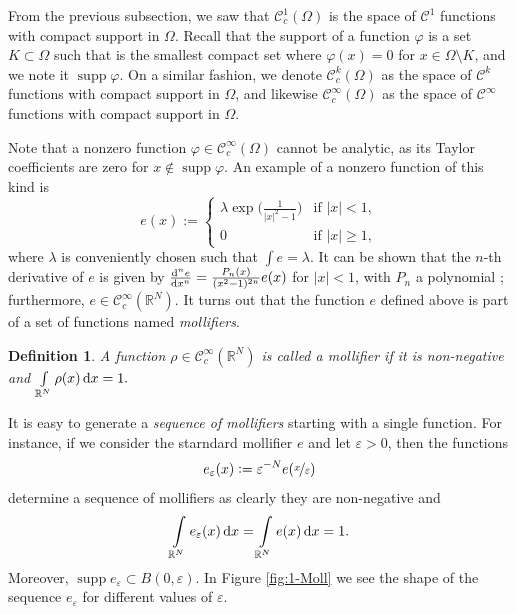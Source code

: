 \documentclass[a4paper,doc,11pt]{article}
\newtheorem{definition}[theorem]{Definition}
\newcommand{\R}{\mathbb{R}}
\newcommand{\CC}{\mathcal{C}}
\DeclareMathOperator{\supp}{supp}
\begin{document}
From the previous subsection, we saw that \(\CC_c^1 (\Omega)\) is the space of \(\CC^1\) functions with compact support in \(\Omega\). Recall that the support of a function \(\varphi\) is a set \( K \subset \Omega\) such that is the smallest compact set where \( \varphi (x) = 0\) for \( x\in \Omega \setminus K\), and we note it \(\supp \varphi\). On a similar fashion, we denote \(\CC_c^k (\Omega)\) as the space of \(\CC^k\) functions with compact support in \(\Omega\), and likewise \(\CC_c^\infty(\Omega)\) as the space of \(\CC^\infty\) functions with compact support in \(\Omega\).

Note that a nonzero function \(\varphi \in \CC_c^\infty (\Omega)\) cannot be analytic, as its Taylor coefficients are zero for \( x \notin \supp \varphi\). An example of a nonzero function of this kind is 
\[
    e(x) := 
    \begin{cases}
        \lambda \exp \Big( \frac{1}{|x|^2-1} \Big) & \text{if } |x| < 1,
        \\
        0   & \text{if } |x| \geq 1,
    \end{cases}
\]
where \(\lambda\) is conveniently chosen such that \( \int e = \lambda \).
It can be shown that the \(n\)-th derivative of \(e\) is given by \( \od[n]{e}{x} = \frac{P_n(x)}{(x^2-1)^{2n}} e(x) \) for \( |x| < 1\), with \(P_n\) a polynomial \citep{Ball2019}; furthermore, \( e \in \CC_c^\infty (\R^N)\). 
It turns out that the function \(e\) defined above is part of a set of functions named \emph{mollifiers}. 

\begin{definition}
    A function \( \rho \in \CC_c^\infty(\R^N)\) is called a \emph{mollifier} if it is non-negative and 
    \(
        \int\limits_{\R^N} \rho(x) \dif x = 1.
    \)
\end{definition}

It is easy to generate a \emph{sequence of mollifiers} starting with a single function. For instance, if we consider the starndard mollifier \(e\) and let \(\varepsilon > 0\), then the functions
\[
    e_\varepsilon (x) := \varepsilon^{-N} e( \nicefrac x \varepsilon )
\]
determine a sequence of mollifiers as clearly they are non-negative and 
\[
    \int\limits_{\R^N} e_\varepsilon (x) \dif x = \int\limits_{\R^N} e(x) \dif x = 1.
\]
Moreover, \( \supp e_\varepsilon \subset B(0,\varepsilon) \). In Figure \ref{fig:1-Moll} we see the shape of the sequence \( e_\varepsilon\) for different values of \(\varepsilon\).
%
\end{document}
